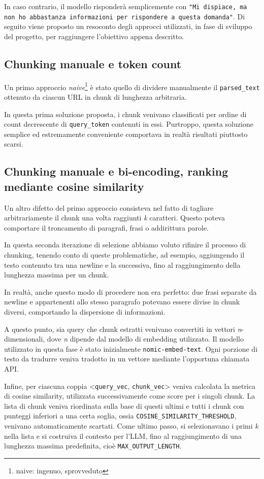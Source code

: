 In caso contrario, il modello risponderà semplicemente con \texttt{"Mi dispiace, ma non ho abbastanza informazioni per rispondere a questa domanda"}. Di seguito viene proposto un resoconto degli approcci utilizzati, in fase di sviluppo del progetto, per raggiungere l'obiettivo appena descritto. 
\subsection{Chunking manuale e token count}
Un primo approccio \textit{naive}\footnote{naive: ingenuo, sprovveduto} è stato quello di dividere manualmente il \texttt{parsed\_text} ottenuto da ciascun URL in chunk di lunghezza arbitraria.

In questa prima soluzione proposta, i chunk venivano classificati per ordine di count decrescente di \texttt{query\_token} contenuti in essi. Purtroppo, questa soluzione semplice ed estremamente conveniente comportava in realtà risultati piuttosto scarsi.

\subsection{Chunking manuale e bi-encoding, ranking mediante cosine similarity}
Un altro difetto del primo approccio consisteva nel fatto di tagliare arbitrariamente il chunk una volta raggiunti \textit{k} caratteri. Questo poteva comportare il troncamento di paragrafi, frasi o addirittura parole.

In questa seconda iterazione di selezione abbiamo voluto rifinire il processo di chunking, tenendo conto di queste problematiche, ad esempio, aggiungendo il testo contenuto tra una newline e la successiva, fino al raggiungimento della lunghezza massima per un chunk.

In realtà, anche questo modo di procedere non era perfetto: due frasi separate da newline e appartenenti allo stesso paragrafo potevano essere divise in chunk diversi, comportando la dispersione di informazioni.

A questo punto, sia query che chunk estratti venivano convertiti in vettori \textit{n}-dimensionali, dove \textit{n} dipende dal modello di embedding utilizzato. Il modello utilizzato in questa fase è stato inizialmente \texttt{nomic-embed-text}. Ogni porzione di testo da tradurre veniva tradotto in un vettore mediante l'opportuna chiamata API.

Infine, per ciascuna coppia <\texttt{query\_vec}, \texttt{chunk\_vec}> veniva calcolata la metrica di cosine similarity, utilizzata successivamente come score per i singoli chunk. La lista di chunk veniva riordinata sulla base di questi ultimi e tutti i chunk con punteggi inferiori a una certa soglia, ossia \texttt{COSINE\_SIMILARITY\_THRESHOLD}, venivano automaticamente scartati. Come ultimo passo, si selezionavano i primi \textit{k} nella lista e si costruiva il contesto per l'LLM, fino al raggiungimento di una lunghezza massima predefinita, cioè \texttt{MAX\_OUTPUT\_LENGTH}.

